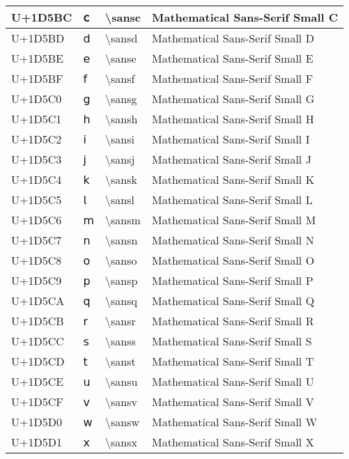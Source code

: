 \begin{table}[h]
\begin{tabulary}{\linewidth}{|L|L|L|L|}
\hline
U+1D5BC & 𝖼 & {\textbackslash}sansc & Mathematical Sans-Serif Small C \\
\hline
U+1D5BD & 𝖽 & {\textbackslash}sansd & Mathematical Sans-Serif Small D \\
\hline
U+1D5BE & 𝖾 & {\textbackslash}sanse & Mathematical Sans-Serif Small E \\
\hline
U+1D5BF & 𝖿 & {\textbackslash}sansf & Mathematical Sans-Serif Small F \\
\hline
U+1D5C0 & 𝗀 & {\textbackslash}sansg & Mathematical Sans-Serif Small G \\
\hline
U+1D5C1 & 𝗁 & {\textbackslash}sansh & Mathematical Sans-Serif Small H \\
\hline
U+1D5C2 & 𝗂 & {\textbackslash}sansi & Mathematical Sans-Serif Small I \\
\hline
U+1D5C3 & 𝗃 & {\textbackslash}sansj & Mathematical Sans-Serif Small J \\
\hline
U+1D5C4 & 𝗄 & {\textbackslash}sansk & Mathematical Sans-Serif Small K \\
\hline
U+1D5C5 & 𝗅 & {\textbackslash}sansl & Mathematical Sans-Serif Small L \\
\hline
U+1D5C6 & 𝗆 & {\textbackslash}sansm & Mathematical Sans-Serif Small M \\
\hline
U+1D5C7 & 𝗇 & {\textbackslash}sansn & Mathematical Sans-Serif Small N \\
\hline
U+1D5C8 & 𝗈 & {\textbackslash}sanso & Mathematical Sans-Serif Small O \\
\hline
U+1D5C9 & 𝗉 & {\textbackslash}sansp & Mathematical Sans-Serif Small P \\
\hline
U+1D5CA & 𝗊 & {\textbackslash}sansq & Mathematical Sans-Serif Small Q \\
\hline
U+1D5CB & 𝗋 & {\textbackslash}sansr & Mathematical Sans-Serif Small R \\
\hline
U+1D5CC & 𝗌 & {\textbackslash}sanss & Mathematical Sans-Serif Small S \\
\hline
U+1D5CD & 𝗍 & {\textbackslash}sanst & Mathematical Sans-Serif Small T \\
\hline
U+1D5CE & 𝗎 & {\textbackslash}sansu & Mathematical Sans-Serif Small U \\
\hline
U+1D5CF & 𝗏 & {\textbackslash}sansv & Mathematical Sans-Serif Small V \\
\hline
U+1D5D0 & 𝗐 & {\textbackslash}sansw & Mathematical Sans-Serif Small W \\
\hline
U+1D5D1 & 𝗑 & {\textbackslash}sansx & Mathematical Sans-Serif Small X \\

\end{tabulary}
\end{table}
